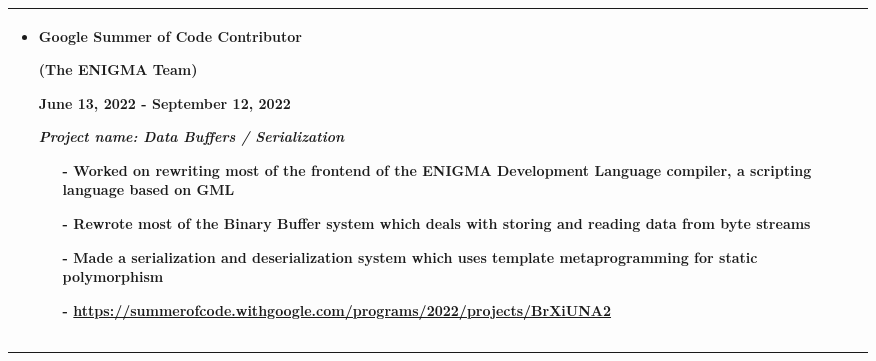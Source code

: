 \documentclass[12pt]{article}
\newcommand{\primarycolor}{red}
\newcommand{\mysection}[1]{{\large\color{\primarycolor}{#1}}}
\begin{document}
\begin{tabularx}{\textwidth}{p{0.4\hsize}|X}
\begin{itemize}[itemsep=1.5ex,leftmargin=1ex]
\begin{itemize}[itemsep=3ex, leftmargin=0.1ex]
                \item\textbf{Google Summer of Code Contributor}

                \textbf{(The ENIGMA Team)}

                {\color{\primarycolor}June 13, 2022 - September 12, 2022}

                \textit{Project name: Data Buffers / Serialization}

                \begin{itemize}[itemsep=1ex, leftmargin=3.5ex]
                    \item[-] Worked on rewriting most of the frontend of the ENIGMA Development Language compiler, a scripting language based on GML
                    \item[-] Rewrote most of the Binary Buffer system which deals with storing and reading data from byte streams
                    \item[-] Made a serialization and deserialization system which uses template metaprogramming for static polymorphism
                    \item[-] \url{https://summerofcode.withgoogle.com/programs/2022/projects/BrXiUNA2}
                \end{itemize}
            \end{itemize}
        \end{itemize} \\

        \hline
    \end{tabularx}

    \clearpage
    \vspace{1ex}
    \hrule
    \vspace{2ex}
    \noindent\mysection{Projects}
\end{document}
